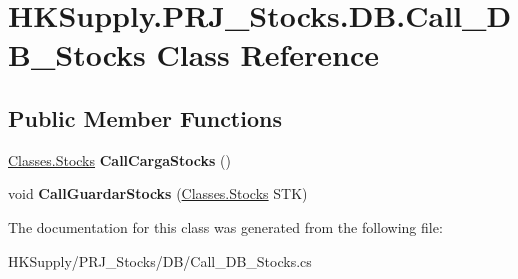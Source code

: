 \hypertarget{class_h_k_supply_1_1_p_r_j___stocks_1_1_d_b_1_1_call___d_b___stocks}{}\section{H\+K\+Supply.\+P\+R\+J\+\_\+\+Stocks.\+D\+B.\+Call\+\_\+\+D\+B\+\_\+\+Stocks Class Reference}
\label{class_h_k_supply_1_1_p_r_j___stocks_1_1_d_b_1_1_call___d_b___stocks}
\subsection*{Public Member Functions}
\begin{DoxyCompactItemize}
\item 
\mbox{\label{class_h_k_supply_1_1_p_r_j___stocks_1_1_d_b_1_1_call___d_b___stocks_aa243739dbcff579ad0e98c7eaa162239}} 
\mbox{\hyperlink{class_h_k_supply_1_1_p_r_j___stocks_1_1_classes_1_1_stocks}{Classes.\+Stocks}} {\bfseries Call\+Carga\+Stocks} ()
\item 
\mbox{\label{class_h_k_supply_1_1_p_r_j___stocks_1_1_d_b_1_1_call___d_b___stocks_a6ad1c1e537a2951a283ad0fa997d4bd8}} 
void {\bfseries Call\+Guardar\+Stocks} (\mbox{\hyperlink{class_h_k_supply_1_1_p_r_j___stocks_1_1_classes_1_1_stocks}{Classes.\+Stocks}} S\+TK)
\end{DoxyCompactItemize}


The documentation for this class was generated from the following file\+:\begin{DoxyCompactItemize}
\item 
H\+K\+Supply/\+P\+R\+J\+\_\+\+Stocks/\+D\+B/Call\+\_\+\+D\+B\+\_\+\+Stocks.\+cs\end{DoxyCompactItemize}
